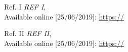 \begin{thebibliography}{9}
    \vspace{-0.2cm}

    Ref. I
    \textit{REF I}, \\
    Available online [25/06/2019]:
    \url{https://} \\
    \vspace{-0.5cm}
    
    Ref. II
    \textit{REF II}, \\
    Available online [25/06/2019]:
    \url{https://} \\
    \vspace{-0.5cm}
\end{thebibliography}
\newpage
\hfill\break
